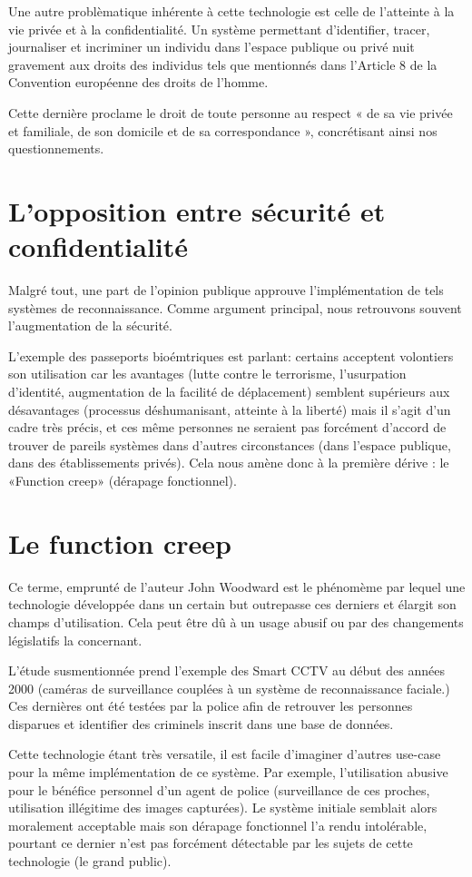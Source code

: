 Une autre problèmatique inhérente à cette technologie est celle de l’atteinte à la vie privée et à la confidentialité.
Un système permettant d’identifier, tracer, journaliser et incriminer un individu dans l’espace publique ou privé
nuit gravement aux droits des individus tels que mentionnés dans l’Article 8 de la Convention européenne des droits
de l’homme.

Cette dernière proclame le droit de toute personne au respect « de sa vie privée et familiale, de son domicile et de
sa correspondance », concrétisant ainsi nos questionnements.

\section{L’opposition entre sécurité et confidentialité}
Malgré tout, une part de l’opinion publique approuve l’implémentation de tels systèmes de reconnaissance.
Comme argument principal, nous retrouvons souvent l’augmentation de la sécurité.

L’exemple des passeports bioémtriques est parlant: certains acceptent volontiers son utilisation car les avantages
(lutte contre le terrorisme, l’usurpation d’identité, augmentation de la facilité de déplacement) semblent
supérieurs aux désavantages (processus déshumanisant, atteinte à la liberté) mais il s’agit d’un cadre très précis, et
ces même personnes ne seraient pas forcément d’accord de trouver de pareils systèmes dans d’autres
circonstances (dans l’espace publique, dans des établissements privés). Cela nous amène donc à la première dérive
: le «Function creep» (dérapage fonctionnel).

\section{Le function creep}
Ce terme, emprunté de l’auteur John Woodward est le phénomème par lequel une technologie développée dans
un certain but outrepasse ces derniers et élargit son champs d’utilisation. Cela peut être dû à un usage abusif ou
par des changements législatifs la concernant.

L’étude susmentionnée prend l’exemple des Smart CCTV au début des années 2000 (caméras de surveillance
couplées à un système de reconnaissance faciale.) Ces dernières ont été testées par la police afin de retrouver les
personnes disparues et identifier des criminels inscrit dans une base de données.

Cette technologie étant très versatile, il est facile d’imaginer d’autres use-case pour la même implémentation de
ce système. Par exemple, l’utilisation abusive pour le bénéfice personnel d’un agent de police (surveillance de ces
proches, utilisation illégitime des images capturées). Le système initiale semblait alors moralement acceptable mais
son dérapage fonctionnel l’a rendu intolérable, pourtant ce dernier n’est pas forcément détectable par les sujets
de cette technologie (le grand public).

